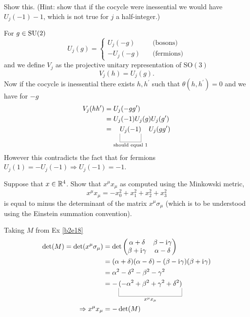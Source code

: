 \documentclass[10pt]{article}
\begin{document}
\begin{example}
	Show this. (Hint: show that if the cocycle were inessential we would have $U_j(-1)-1$, which is not true for $j$ a half-integer.)
\end{example}
\sol For $g \in \text{SU}(2)$
$$
U_j(g) = \begin{cases}
	U_j(-g)\quad&\text{(bosons)}\\
	-U_j(-g)\quad&\text{(fermions)}
\end{cases}
$$
and  we define $V_j$ as the projective unitary representation of SO$(3)$
$$
	V_j(h) = U_j(g).
$$
Now if the cocycle is inessential there exists $h,h^\prime$ such that $\theta(h,h^\prime) = 0$ and we have for $-g$
$$
\begin{aligned}
	V_j(hh^\prime) &= U_j(-gg^\prime)\\
	&= U_j(-1)U_j(g)U_j(g^\prime)\\
	&= \ub{U_j(-1)}{\text{should equal 1}}U_j(gg^\prime)
\end{aligned}
$$
However this contradicts the fact that for fermions $U_j(1)=-U_j(-1) \Rightarrow U_j(-1) = -1$.


\begin{example}\label{b2e28}
	Suppose that $x \in \mathbb{R}^4$. Show that $x^\mu x_\mu$ as computed using the Minkowski metric,
	$$
	x^\mu x_\mu = -x_0^2 + x_1^2 + x_2^2 + x_3^2
	$$
	is equal to minus the determinant of the matrix $x^\mu \sigma_\mu$ (which is to be understood using the Einstein summation convention).
\end{example}
\sol Taking $M$ from Ex \ref{b2e18}
$$
\begin{aligned}
	\det (M) = \det(x^\mu \sigma_\mu) &= \det\begin{pmatrix}
		\alpha+\delta&\beta-\di\gamma\\\beta+\di\gamma&\alpha-\delta
	\end{pmatrix}\\
	&= (\alpha+\delta)(\alpha-\delta)-(\beta-\di\gamma)(\beta+\di\gamma)\\
	&= \alpha^2-\delta^2-\beta^2-\gamma^2\\
	&= -\ub{(-\alpha^2+\beta^2+\gamma^2+\delta^2)}{x^\mu x_\mu}\\
	\Rightarrow x^\mu x_\mu &= -\det(M)
\end{aligned}
$$
\end{document}
